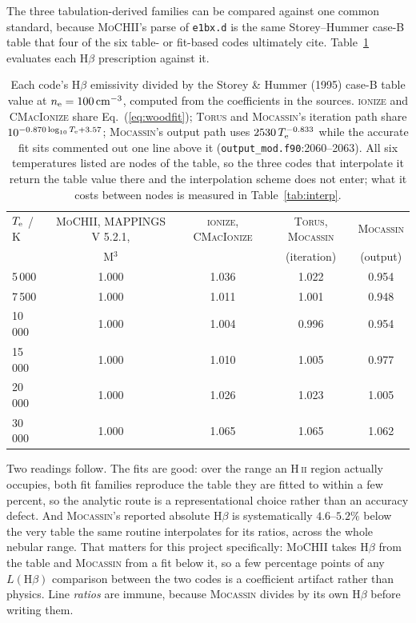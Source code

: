 \documentclass[english,a4paper]{my_memo}
\newcommand{\code}[1]{\texttt{#1}}
\newcommand{\MoCHII}{\textsc{MoCHII}}
\newcommand{\Mthree}{M$^3$}
\newcommand{\Mappings}{MAPPINGS V 5.2.1}
\newcommand{\Wood}{\textsc{ionize}}
\newcommand{\CMI}{\textsc{CMacIonize}}
\newcommand{\Torus}{\textsc{Torus}}
\newcommand{\Mocassin}{\textsc{Mocassin}}
\newcommand{\HII}{H\,\textsc{ii}}
\newcommand{\Te}{T_{\rm e}}
\newcommand{\nelec}{n_{\rm e}}
\begin{document}
The three tabulation-derived families can be compared against one common
standard, because \MoCHII{}'s parse of \code{e1bx.d} is the same
Storey--Hummer case-B table that four of the six table- or fit-based codes
ultimately cite.  Table~\ref{tab:hbetafits}
evaluates each H$\beta$ prescription against it.

\begin{table}[htbp]
\centering
\caption{Each code's H$\beta$ emissivity divided by the Storey \& Hummer
(1995) case-B table value at $\nelec = 100\,\mathrm{cm^{-3}}$, computed from
the coefficients in the sources.  \Wood{} and \CMI{} share
Eq.~(\ref{eq:woodfit}); \Torus{} and \Mocassin{}'s iteration path share
$10^{-0.870\log_{10}\Te + 3.57}$; \Mocassin{}'s output path uses
$2530\,\Te^{-0.833}$ while the accurate fit sits commented out one line above
it (\code{output\_mod.f90}:2060--2063).  All six temperatures listed are
nodes of the table, so the three codes that interpolate it return the table
value there and the interpolation scheme does not enter; what it costs between
nodes is measured in Table~\ref{tab:interp}.}
\label{tab:hbetafits}
\begin{tabular}{lcccc}
\toprule
$\Te$ / K & \MoCHII{}, \Mappings{}, & \Wood{}, \CMI{} &
\Torus{}, \Mocassin{} & \Mocassin{} \\
 & \Mthree{} & & (iteration) & (output) \\
\midrule
 5\,000 & 1.000 & 1.036 & 1.022 & 0.954 \\
 7\,500 & 1.000 & 1.011 & 1.001 & 0.948 \\
10\,000 & 1.000 & 1.004 & 0.996 & 0.954 \\
15\,000 & 1.000 & 1.010 & 1.005 & 0.977 \\
20\,000 & 1.000 & 1.026 & 1.023 & 1.005 \\
30\,000 & 1.000 & 1.065 & 1.065 & 1.062 \\
\bottomrule
\end{tabular}
\end{table}

Two readings follow.  The fits are good: over the range an \HII{} region
actually occupies, both fit families reproduce the table they are fitted to
within a few percent, so the analytic route is a representational choice
rather than an accuracy defect.  And \Mocassin{}'s reported absolute
H$\beta$ is systematically $4.6$--$5.2\%$ below the very table the same
routine interpolates for its ratios, across the whole nebular range.  That
matters for this project specifically: \MoCHII{} takes H$\beta$ from the
table and \Mocassin{} from a fit below it, so a few percentage points of any
$L(\mathrm{H}\beta)$ comparison between the two codes is a coefficient
artifact rather than physics.  Line \emph{ratios} are immune, because
\Mocassin{} divides by its own H$\beta$ before writing them.
\end{document}
